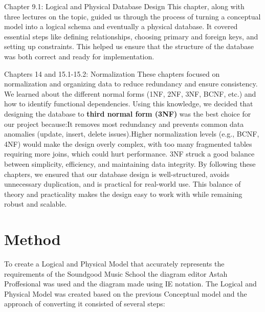 \documentclass[a4paper]{scrartcl}
\begin{document}
Chapter 9.1: Logical and Physical Database Design
This chapter, along with three lectures on the topic, guided us through the process of turning a conceptual model into a logical schema and eventually a physical database. It covered essential steps like defining relationships, choosing primary and foreign keys, and setting up constraints. This helped us ensure that the structure of the database was both correct and ready for implementation.

Chapters 14 and 15.1-15.2: Normalization
These chapters focused on normalization and organizing data to reduce redundancy and ensure consistency. We learned about the different normal forms (1NF, 2NF, 3NF, BCNF, etc.) and how to identify functional dependencies. Using this knowledge, we decided that designing the database to \textbf{third normal form (3NF)} was the best choice for our project because:It removes most redundancy and prevents common data anomalies (update, insert, delete issues).Higher normalization levels (e.g., BCNF, 4NF) would make the design overly complex, with too many fragmented tables requiring more joins, which could hurt performance. 3NF struck a good balance between simplicity, efficiency, and maintaining data integrity. By following these chapters, we ensured that our database design is well-structured, avoids unnecessary duplication, and is practical for real-world use. This balance of theory and practicality makes the design easy to work with while remaining robust and scalable.

\section{Method}

To create a Logical and Physical Model that accurately represents the requirements of the Soundgood Music School the diagram editor Astah Proffesional was used and the diagram made using IE notation. The Logical and Physical Model was created based on the previous Conceptual model and the approach  of converting it consisted of several steps:
\end{document}
